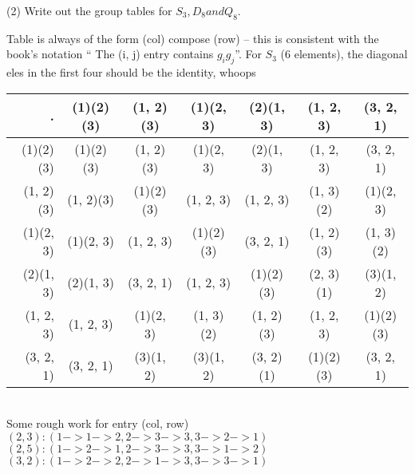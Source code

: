 \documentclass[1    0pt, answers]{exam} \renewcommand{\baselinestretch}{1.05}
\theoremstyle{plain}
\theoremstyle{definition}
\begin{document}
\begin{questions}
\question (2) Write out the group tables for $S_3, D_8 and Q_8$.
\begin{solution}
\end{solution}

\begin{solution}
Table is always of the form (col) compose (row) -- this is consistent with the book's notation
`` The (i, j) entry contains $g_i g_j$''.
\renewcommand\arraystretch{1.3}
\setlength\doublerulesep{0pt}
For $S_3$ (6 elements), the diagonal eles in the first four should be the identity, whoops\\
\pagebreak

\begin{tabular}{r||c|c|c|c|c|c||}
. &         (1)(2)(3) & (1, 2)(3) & (1)(2, 3) & (2)(1, 3) & (1, 2, 3) & (3, 2, 1)  \\
\hline\hline
(1)(2)(3) & (1)(2)(3) & (1, 2)(3) & (1)(2, 3) & (2)(1, 3) & (1, 2, 3) & (3, 2, 1) \\ 
\hline
(1, 2)(3) & (1, 2)(3) & (1)(2)(3) & (1, 2, 3) & (1, 2, 3) & (1, 3)(2) & (1)(2, 3)\\ 
\hline
(1)(2, 3) & (1)(2, 3) & (1, 2, 3) & (1)(2)(3) & (3, 2, 1) & (1, 2)(3) & (1, 3)(2)\\ 
\hline
(2)(1, 3) & (2)(1, 3) & (3, 2, 1) & (1, 2, 3) & (1)(2)(3) & (2, 3)(1) & (3)(1, 2)\\ 
\hline
(1, 2, 3) & (1, 2, 3) & (1)(2, 3) & (1, 3)(2) & (1, 2)(3) & (1, 2, 3) & (1)(2)(3) \\
\hline
(3, 2, 1) & (3, 2, 1) & (3)(1, 2) & (3)(1, 2) & (3, 2)(1) & (1)(2)(3) & (3, 2, 1)\\
\hline
\end{tabular}\\
Some rough work for entry (col, row)
$(2,3): (1 -> 1 -> 2, 2 -> 3 -> 3, 3 -> 2 -> 1)$
$(2,5): (1 -> 2 -> 1, 2 -> 3 -> 3, 3 -> 1 -> 2)$
$(3,2): (1 -> 2 -> 2, 2 -> 1 -> 3, 3 -> 3 -> 1)$


\end{solution}
\end{questions}
\end{document}

